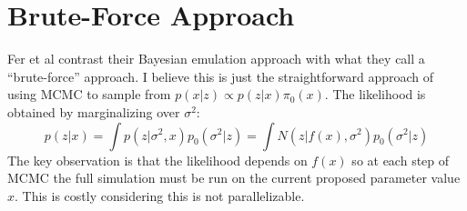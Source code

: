 \documentclass[12pt]{article}
\begin{document}
\section{Brute-Force Approach}
Fer et al contrast their Bayesian emulation approach with what they call a ``brute-force'' approach. I believe this is just the straightforward approach of using MCMC to sample from 
$p(x|z) \propto p(z|x)\pi_0(x)$. The likelihood is obtained by marginalizing over $\sigma^2$: 
\[p(z|x) = \int p(z|\sigma^2, x)p_0(\sigma^2|z) = \int N(z|f(x), \sigma^2) p_0(\sigma^2|z)\] 
The key observation is that the likelihood depends on $f(x)$ so at each step of MCMC the full simulation must be run on the current proposed parameter value $x$. This is costly considering 
this is not parallelizable. 
\end{document}
